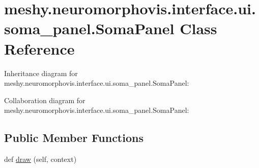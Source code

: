 \hypertarget{classmeshy_1_1neuromorphovis_1_1interface_1_1ui_1_1soma__panel_1_1SomaPanel}{}\section{meshy.\+neuromorphovis.\+interface.\+ui.\+soma\+\_\+panel.\+Soma\+Panel Class Reference}
\label{classmeshy_1_1neuromorphovis_1_1interface_1_1ui_1_1soma__panel_1_1SomaPanel}


 




Inheritance diagram for meshy.\+neuromorphovis.\+interface.\+ui.\+soma\+\_\+panel.\+Soma\+Panel\+:


Collaboration diagram for meshy.\+neuromorphovis.\+interface.\+ui.\+soma\+\_\+panel.\+Soma\+Panel\+:
\subsection*{Public Member Functions}
\begin{DoxyCompactItemize}
\item 
def \hyperlink{classmeshy_1_1neuromorphovis_1_1interface_1_1ui_1_1soma__panel_1_1SomaPanel_a48186a7dce8b903008f0b5355192baaf}{draw} (self, context)
\end{DoxyCompactItemize}
